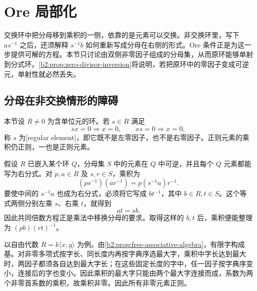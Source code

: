 
\section{Ore 局部化}
\label{b2:sec:1901}

交换环中把分母移到乘积的一侧，依靠的是元素可以交换。非交换环里，写下 \(as^{-1}\) 之后，还须解释 \(s^{-1}b\) 如何重新写成分母在右侧的形式。Ore 条件正是为这一步提供可解的方程。本节只讨论由双侧非零因子组成的分母集，从而原环能够单射到分式环。\cref{b2:prop:zero-divisor-inversion}将说明，若把原环中的零因子变成可逆元，单射性就必然丢失。

%
%

\subsection{分母在非交换情形的障碍}
\label{b2:subsec:1901:01}

本节设 \(R\ne0\) 为含单位元的环。若 \(s\in R\) 满足
\[
	sx=0\Longrightarrow x=0,\qquad xs=0\Longrightarrow x=0,
\]
称 \(s\) 为[regular element]，即它既不是左零因子，也不是右零因子。正则元素的乘积仍正则，一也是正则元素。

\ProseParagraphBreak
假设 \(R\) 已嵌入某个环 \(Q\)，分母集 \(S\) 中的元素在 \(Q\) 中可逆，并且每个 \(Q\) 元素都能写为右分式。对 \(p,a\in R\) 及 \(s,r\in S\)，乘积为
\[
	(ps^{-1})(ar^{-1})=p(s^{-1}a)r^{-1}.
\]
要使中间的 \(s^{-1}a\) 也成为右分式，必须将它写成 \(bt^{-1}\)，其中 \(b\in R,t\in S\)。这个等式两侧分别左乘 \(s\)、右乘 \(t\)，就得到
\[
	at=sb.
\]
因此共同倍数方程正是乘法中移换分母的要求。取得这样的 \(b,t\) 后，乘积便能整理为 \((pb)(rt)^{-1}\)。

\ProseParagraphBreak
以自由代数 \(R=k\langle x,y\rangle\) 为例。由\cref{b2:prop:free-associative-algebra}，有限字构成基。对非零多项式按字长、同长度内再按字典序选最大字，乘积中字长达到最大时，两因子都须各自达到最大字长；在这些固定长度的字中，任一因子按字典序变小，连接后的字也变小。因此乘积的最大字只能由两个最大字连接而成，系数为两个非零首系数的乘积，故乘积非零。因此所有非零元素正则。

